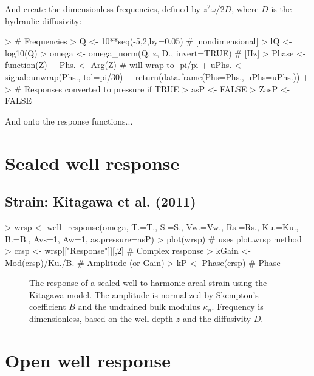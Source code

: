 \documentclass[12pt]{article}
\begin{document}
And create the dimensionless frequencies, 
defined by $z^2 \omega / 2 D$,
where $D$ is the hydraulic diffusivity:

\begin{Schunk}
\begin{Sinput}
> # Frequencies
> Q <- 10**seq(-5,2,by=0.05)					# [nondimensional]
> lQ <- log10(Q)
> omega <- omega_norm(Q, z, D., invert=TRUE)		# [Hz]
> Phase <- function(Z){
+ 	Phs. <- Arg(Z) # will wrap to -pi/pi
+ 	uPhs. <- signal::unwrap(Phs., tol=pi/30)
+ 	return(data.frame(Phs=Phs., uPhs=uPhs.))
+ }
> # Responses converted to pressure if TRUE
> asP <- FALSE
> ZasP <- FALSE
\end{Sinput}
\end{Schunk}

And onto the response functions...

\clearpage
\section{Sealed well response}

\subsection{Strain: Kitagawa et al. (2011)}
%
\begin{Schunk}
\begin{Sinput}
> wrsp <- well_response(omega, T.=T., S.=S., Vw.=Vw., Rs.=Rs., Ku.=Ku., B.=B., Avs=1, Aw=1, as.pressure=asP)
> plot(wrsp) # uses plot.wrsp method
> crsp <- wrsp[["Response"]][,2]	# Complex response
> kGain <- Mod(crsp)/Ku./B.			# Amplitude (or Gain)
> kP <- Phase(crsp)				# Phase
\end{Sinput}
\end{Schunk}

\begin{figure}[htb!]
\begin{center}
\caption{The response of a sealed well to harmonic areal strain using
the Kitagawa model. The amplitude is normalized by Skempton's coefficient $B$
and the undrained bulk modulus $\kappa_u$.
Frequency is dimensionless, based on the well-depth $z$ and the diffusivity $D$.
}
\label{fig:wrsp}
\end{center}
\end{figure}

\clearpage
\section{Open well response}
\end{document}

